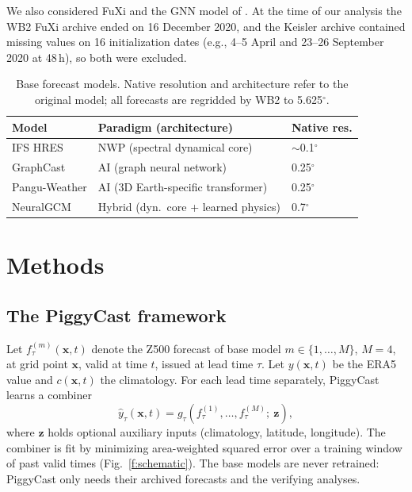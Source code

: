 \documentclass[twocol]{ametsocV6.1}
\newcommand{\Zfive}{Z500}
\begin{document}
We also considered FuXi \citep{chen2023fuxi} and the GNN model of \citet{keisler2022gnn}. At the time of our analysis the WB2 FuXi archive ended on 16 December 2020, and the Keisler archive contained missing values on 16 initialization dates (e.g., 4--5 April and 23--26 September 2020 at 48\,h), so both were excluded.

\begin{table}[t]
\caption{Base forecast models. Native resolution and architecture refer to the original model; all forecasts are regridded by WB2 to 5.625$^\circ$.}\label{t:models}
\begin{center}
\small\setlength{\tabcolsep}{4pt}
\begin{tabular}{lll}
\hline\hline
Model & Paradigm (architecture) & Native res. \\
\hline
IFS HRES & NWP (spectral dynamical core) & $\sim$0.1$^\circ$ \\
GraphCast & AI (graph neural network) & 0.25$^\circ$ \\
Pangu-Weather & AI (3D Earth-specific transformer) & 0.25$^\circ$ \\
NeuralGCM & Hybrid (dyn.\ core + learned physics) & 0.7$^\circ$ \\
\hline
\end{tabular}
\end{center}
\end{table}

\section{Methods}

\subsection{The PiggyCast framework}

Let $f^{(m)}_{\tau}(\mathbf{x}, t)$ denote the \Zfive{} forecast of base model $m\in\{1,\dots,M\}$, $M=4$, at grid point $\mathbf{x}$, valid at time $t$, issued at lead time $\tau$. Let $y(\mathbf{x},t)$ be the ERA5 value and $c(\mathbf{x},t)$ the climatology. For each lead time separately, PiggyCast learns a combiner
\begin{equation}
\hat{y}_\tau(\mathbf{x},t) = g_\tau\!\left(f^{(1)}_\tau, \dots, f^{(M)}_\tau;\ \mathbf{z}\right),
\end{equation}
where $\mathbf{z}$ holds optional auxiliary inputs (climatology, latitude, longitude). The combiner is fit by minimizing area-weighted squared error over a training window of past valid times (Fig.~\ref{f:schematic}). The base models are never retrained: PiggyCast only needs their archived forecasts and the verifying analyses.
\end{document}
